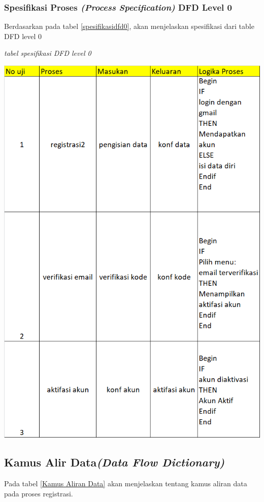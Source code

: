 \subsubsection{Spesifikasi Proses \textit{(Process Specification)} DFD Level 0}
\par
Berdasarkan pada tabel \ref{spesifikasidfd0}, akan menjelaskan spesifikasi dari table DFD level 0
\begin{table}[!htbp]
\captionsetup{singlelinecheck=off}
      \caption{\textit{tabel spesifikasi DFD level 0}}
    \label{spesifikasidfd0}
    \includegraphics[scale=0.6]{gambar/tabellogika.png}
\end{table}


\subsection{Kamus Alir Data\textit{(Data Flow Dictionary)}}
\par
Pada tabel \ref{Kamus Aliran Data} akan menjelaskan tentang kamus aliran data pada proses registrasi.

